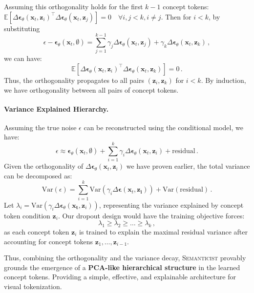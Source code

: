 \documentclass[10pt,twocolumn,letterpaper]{article}
\DeclareRobustCommand{\modelname}{\textsc{Semanticist}\xspace}
\begin{document}
Assuming this orthogonality holds for the first $k-1$ concept tokens:
$\mathbb{E}\left[ \Delta\bm{\epsilon}_\theta(\bm{x}_t, \bm{z}_i)^\top  \Delta\bm{\epsilon}_\theta(\bm{x}_t, \bm{z}_j) \right]=0\quad \forall i, j < k, i \neq j$.
Then for $i<k$, by substituting
\begin{equation}
\epsilon - \bm{\epsilon}_\theta(\bm{x}_t, \emptyset) = \sum_{j=1}^{k-1}\gamma_j \Delta\bm{\epsilon}_\theta(\bm{x}_t, \bm{z}_j) + \gamma_k \Delta\bm{\epsilon}_\theta(\bm{x}_t, \bm{z}_k) \,, \nonumber
\end{equation}
we can have:
\begin{equation}
\mathbb{E}\left[\Delta\bm{\epsilon}_\theta(\bm{x}_t, \bm{z}_i)^\top \Delta\bm{\epsilon}_\theta(\bm{x}_t, \bm{z}_k)\right] = 0 \,. \nonumber
\end{equation}
Thus, the orthogonality propagates to all pairs $(\bm{z}_i,\bm{z}_k)$ for $i<k$.
By induction, we have orthogonality between all pairs of concept tokens.

\paragraph{Variance Explained Hierarchy.}
Assuming the true noise $\epsilon$ can be reconstructed using the conditional model, we have:
\begin{equation}
\epsilon \approx \bm{\epsilon}_{\theta}(\bm{x}_t, \emptyset) + \sum_{i=1}^k \gamma_i \Delta\bm{\epsilon}_\theta(\bm{x}_t, \bm{z}_i) + \text{residual} \,. \nonumber
\end{equation}
Given the orthogonality of $\Delta\bm{\epsilon}_{\theta}(\bm{x}_t, \bm{z}_i)$ we have proven earlier, the total variance can be decomposed as:
\begin{equation}
\text{Var}(\epsilon)=\sum_{i=1}^k \text{Var}(\gamma_i \Delta\bm{\epsilon}(\bm{x}_t, \bm{z_i})) + \text{Var}(\text{residual}) \,. \nonumber
\end{equation}
Let $\lambda_i = \text{Var}(\gamma_i \Delta\bm{\epsilon}_{\theta}(\bm{x_t}, \bm{z}_i))$, representing the variance explained by concept token condition $\bm{z}_i$.
Our dropout design would have the training objective forces:
\begin{equation}
\lambda_1\geq\lambda_2\geq\dots\geq\lambda_k \,, \nonumber
\end{equation}
as each concept token $\bm{z}_i$ is trained to explain the maximal residual variance after accounting for concept tokens $\bm{z}_1, \dots,\bm{z}_{i-1}$.

Thus, combining the orthogonality and the variance decay, \modelname provably grounds the emergence of a \textbf{PCA-like hierarchical structure} in the learned concept tokens. Providing a simple, effective, and explainable architecture for visual tokenization. 
\end{document}
